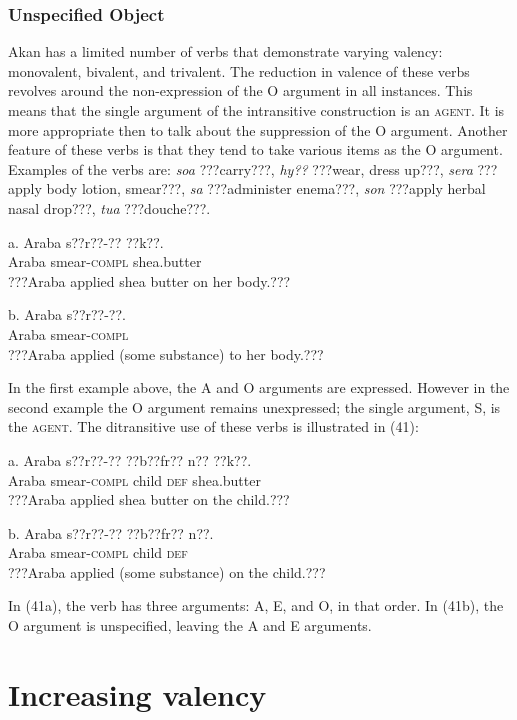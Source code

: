 \documentclass[output=paper]{langsci/langscibook}
\begin{document}
\subsubsection{Unspecified Object}

Akan has a limited number of verbs that demonstrate varying valency: monovalent, bivalent, and trivalent. The reduction in valence of these verbs revolves around the non-expression of the O argument in all instances. This means that the single argument of the intransitive construction is an \textsc{agent}. It is more appropriate then to talk about the suppression of the O argument. Another feature of these verbs is that they tend to take various items as the O argument. Examples of the verbs are: \emph{soa} ???carry???, \emph{hy??} ???wear, dress up???, \emph{sera} ???apply body lotion, smear???, \emph{sa} ???administer enema???, \emph{son} ???apply herbal nasal drop???, \emph{tua} ???douche???.


\ea
\gll a.  Araba  s??r??-??    ??k??.\\
       Araba  smear-\textsc{compl}  shea.butter\\
\glt ???Araba applied shea butter on her body.???
\z

\ea
\gll  b.  Araba  s??r??-??.\\
       Araba  smear-\textsc{compl}\\
\glt ???Araba applied (some substance) to her body.???
\z

In the first example above, the A and O arguments are expressed. However in the second example the O argument remains unexpressed; the single argument, S, is the \textsc{agent}. The ditransitive use of these verbs is illustrated in (41):

\ea
\gll a.  Araba  s??r??-??    ??b??fr??  n??  ??k??.\\
       Araba  smear-\textsc{compl}  child  \textsc{def}  shea.butter\\
\glt ???Araba applied shea butter on the child.???
\z

\ea
\gll  b.  Araba  s??r??-??    ??b??fr??  n??.\\
       Araba  smear-\textsc{compl}  child  \textsc{def}\\
\glt ???Araba applied (some substance) on the child.???
\z

In (41a), the verb has three arguments: A, E, and O, in that order. In (41b), the O argument is unspecified, leaving the A and E arguments.

\section{Increasing valency}
\end{document}
